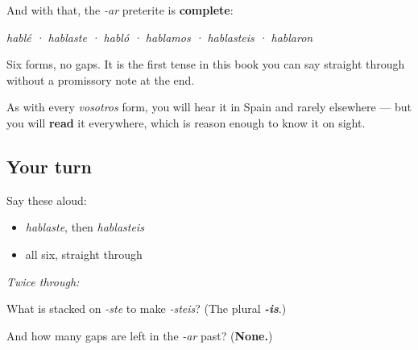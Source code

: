 \begin{culture}
And with that, the \emph{-ar} preterite is \textbf{complete}:

\emph{hablé · hablaste · habló · hablamos · hablasteis · hablaron}

Six forms, no gaps. It is the first tense in this book you can say straight through without a promissory note at the end.

As with every \emph{vosotros} form, you will hear it in Spain and rarely elsewhere — but you will \textbf{read} it everywhere, which is reason enough to know it on sight.
\end{culture}

\subsection*{Your turn}
Say these aloud:

\begin{itemize}
\raggedright
  \item \emph{hablaste}, then \emph{hablasteis}
  \item all six, straight through
\end{itemize}

\emph{Twice through:}

\begin{tcolorbox}[breakable,colback=teal!4,colframe=teal!35!black,title={Before you move on}]
What is stacked on \emph{-ste} to make \emph{-steis}? (The plural \emph{\textbf{-is}}.)

And how many gaps are left in the \emph{-ar} past? (\textbf{None.})
\end{tcolorbox}
